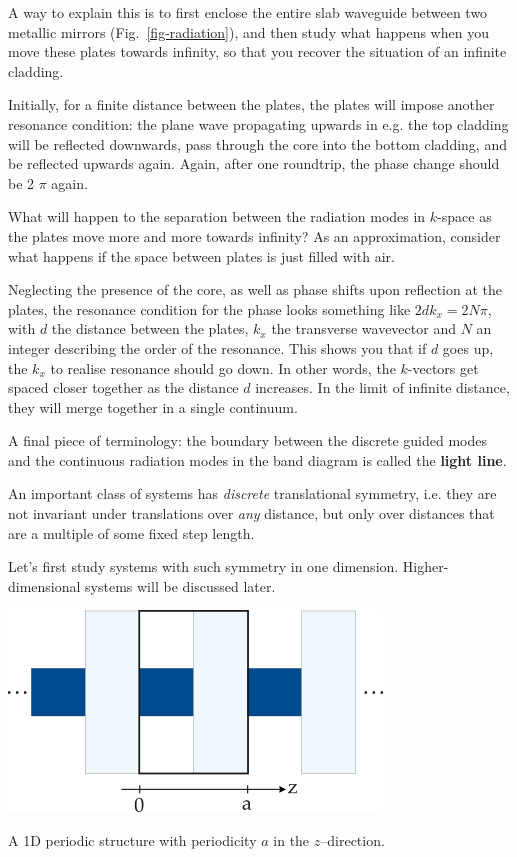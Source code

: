 A way to explain this is to first enclose the entire slab waveguide between two metallic mirrors (Fig.~\ref{fig-radiation}), and then study what happens when you move these plates towards infinity, so that you recover the situation of an infinite cladding.

Initially, for a finite distance between the plates, the plates will impose another resonance condition: the plane wave propagating upwards in e.g. the top cladding will be reflected downwards, pass through the core into the bottom cladding, and be reflected upwards again. Again, after one roundtrip, the phase change should be 2 $\pi$ again.

\begin{cue}
What will happen to the separation between the radiation modes in $k$-space as the plates move more and more towards infinity? As an approximation, consider what happens if the space between plates is just filled with air.
\end{cue}

Neglecting the presence of the core, as well as phase shifts upon reflection at the plates, the resonance condition for the phase looks something like $2 d k_x =  2 N \pi$, with $d$ the distance between the plates, $k_x$ the transverse wavevector and $N$ an integer describing the order of the resonance. This shows you that if $d$ goes up, the $k_x$ to realise resonance should go down. In other words, the $k$-vectors get spaced closer together as the distance $d$ increases. In the limit of infinite distance, they will merge together in a single continuum.

A final piece of terminology: the boundary between the discrete guided modes and the continuous radiation modes in the band diagram is called the \textbf{light line}.

\pagebreak


An important class of systems has \emph{discrete} translational symmetry, i.e. they are not invariant under translations over \emph{any} distance, but only over distances that are a multiple of some fixed step length.

Let's first study systems with such symmetry in one dimension. Higher-dimensional systems will be discussed later.

\begin{marginfigure}
\centering
\includegraphics{symmetry/figures/periodic}
\caption{A 1D periodic structure with periodicity $a$ in the $z$--direction.}
\label{fig-1d-periodic}
\end{marginfigure}

